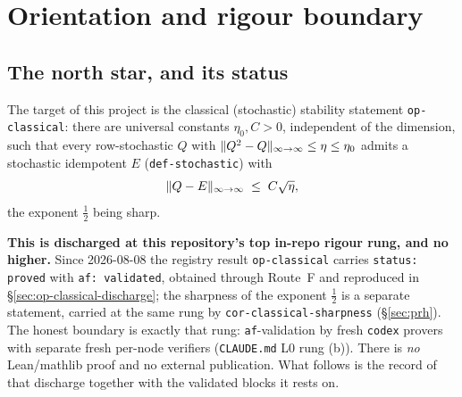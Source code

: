 \section{Orientation and rigour boundary}\label{sec:overview}

\subsection*{The north star, and its status}

The target of this project is the classical (stochastic) stability statement
\texttt{op-classical}: there are universal constants $\eta_0,C>0$, independent of the
dimension, such that every row-stochastic $Q$ with
$\lVert Q^2-Q \rVert_{\infty\to\infty}\le\eta\le\eta_0$ admits a stochastic idempotent $E$
(\texttt{def-stochastic}) with
\begin{equation}\label{eq:ov-target}
  \lVert Q-E \rVert_{\infty\to\infty}\;\le\;C\sqrt{\eta},
\end{equation}
the exponent $\tfrac12$ being sharp.

\textbf{This is discharged at this repository's top in-repo rigour rung, and no
higher.} Since 2026-08-08 the registry result \texttt{op-classical} carries
\texttt{status: proved} with \texttt{af: validated}, obtained through Route~F and
reproduced in \S\ref{sec:op-classical-discharge}; the sharpness of the exponent
$\tfrac12$ is a separate statement, carried at the same rung by
\texttt{cor-classical-sharpness} (\S\ref{sec:prh}). The honest boundary is exactly
that rung: \texttt{af}-validation by fresh \texttt{codex} provers with separate fresh
per-node verifiers (\texttt{CLAUDE.md} L0 rung (b)). There is \emph{no} Lean/mathlib
proof and no external publication. What follows is the record of that discharge
together with the validated blocks it rests on.

